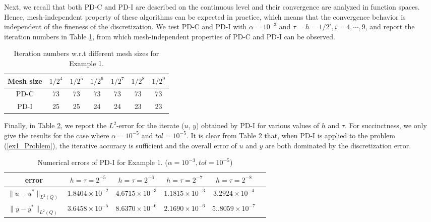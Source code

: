 \documentclass[final]{siamart171218}
\theoremstyle{remark}
\begin{document}
Next, we recall that both PD-C and PD-I are described on the continuous level
and their convergence are analyzed in function spaces. Hence, mesh-independent property of these algorithms can be expected in practice, which means that the convergence behavior is independent of the fineness of the discretization. We test PD-C and PD-I with $\alpha=10^{-3}$ and  $\tau=h={1}/{2^i},i=4,\cdots,9$, and report the iteration numbers in Table \ref{meshindependent_case2_ex1}, from which mesh-independent properties of PD-C and PD-I can be observed.
\begin{table}[h!]
	\centering
	\caption{Iteration numbers w.r.t  different mesh sizes for Example 1.}\label{meshindependent_case2_ex1}
	{\footnotesize\begin{tabular}{|c|c|c|c|c|c|c|}
			\hline
			Mesh size&$1/{2^4}$&$1/{2^5}$&$1/{2^6}$&$1/{2^7}$&$1/{2^8}$&$1/{2^9}$\\
			\hline
			PD-C&73 &73& 73 & 73 & 73& 73\\
			\hline
			PD-I& 25& 25& 24& 24& 23 & 23\\
			\hline
		\end{tabular}
	}
\end{table}


Finally, in Table \ref{err_ex1}, we report the $L^2$-error for the iterate ($u$, $y$) obtained by PD-I for various values of $h$ and $\tau$. For succinctness, we only give the results for the case where $\alpha=10^{-5}$ and $tol= 10^{-5}$. It is clear from Table \ref{err_ex1} that, when  PD-I is applied to the problem (\ref{ex1_Problem}), the iterative accuracy is sufficient and the overall error of $u$ and $y$ are both dominated by the discretization error.


\begin{table}[h!]
	\setlength{\abovecaptionskip}{0pt}
	\setlength{\belowcaptionskip}{3pt}
	\centering
	\caption{Numerical errors of PD-I for Example 1. ($\alpha=10^{-3},tol=10^{-5}$)}\label{err_ex1}
	{\small\begin{tabular}{|c|c|c|c|c|c|}
			\hline
			error&$h=\tau=2^{-5}$&$h=\tau=2^{-6}$&$h=\tau=2^{-7}$&$h=\tau=2^{-8}$\\
			\hline
			$\|u-u^*\|_{L^2(Q)}$&$1.8404\times 10^{-2}$ & $4.6715\times 10^{-3}$&$1.1815\times 10^{-3}$ &$3.2924\times 10^{-4}$\\
			\hline
			$\|y-y^*\|_{L^2(Q)}$& $ 3.6458\times 10^{-5}$ & $  8.6370\times 10^{-6}$& $ 2.1690\times 10^{-6}$&$5..8059\times 10^{-7}$\\
			\hline
		\end{tabular}
	}
\end{table}
\end{document}
